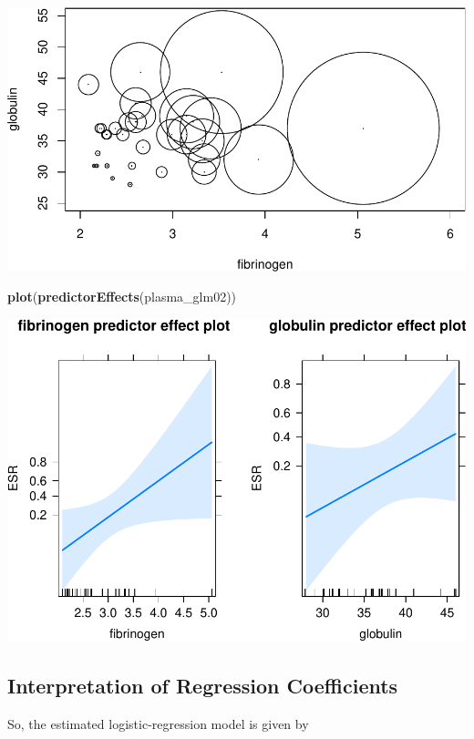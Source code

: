 \documentclass[
]{article}
\newenvironment{Shaded}{\begin{snugshade}}{\end{snugshade}}
\newcommand{\KeywordTok}[1]{\textcolor[rgb]{0.13,0.29,0.53}{\textbf{#1}}}
\newcommand{\NormalTok}[1]{#1}
\begin{document}
\includegraphics{LogisticRegressionCh5_files/figure-latex/unnamed-chunk-6-1.pdf}

\begin{Shaded}
\begin{Highlighting}[]
\KeywordTok{plot}\NormalTok{(}\KeywordTok{predictorEffects}\NormalTok{(plasma_glm02))}
\end{Highlighting}
\end{Shaded}

\includegraphics{LogisticRegressionCh5_files/figure-latex/unnamed-chunk-6-2.pdf}

\hypertarget{interpretation-of-regression-coefficients}{%
\subsection{Interpretation of Regression
Coefficients}\label{interpretation-of-regression-coefficients}}

So, the estimated logistic-regression model is given by
\end{document}
